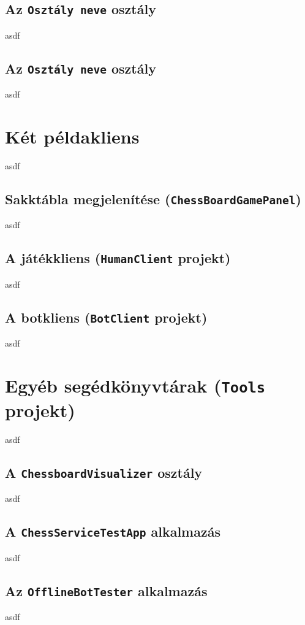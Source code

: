 \documentclass[twoside, a4paper, 12pt]{book}
\begin{document}
\subsection{Az \texttt{Osztály neve} osztály}
asdf
\subsection{Az \texttt{Osztály neve} osztály}
asdf

\section{Két példakliens}
asdf
\subsection{Sakktábla megjelenítése (\texttt{ChessBoardGamePanel})}
asdf
\subsection{A játékkliens (\texttt{HumanClient} projekt)}
asdf
\subsection{A botkliens (\texttt{BotClient} projekt)}
asdf

\section{Egyéb segédkönyvtárak (\texttt{Tools} projekt)}
asdf
\subsection{A \texttt{ChessboardVisualizer} osztály}
asdf
\subsection{A \texttt{ChessServiceTestApp} alkalmazás}
asdf
\subsection{Az \texttt{OfflineBotTester} alkalmazás}
asdf
\end{document}
